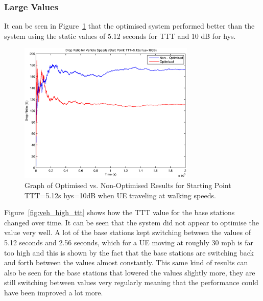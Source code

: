 \subsubsection*{Large Values}
It can be seen in Figure~\ref{fig:veh_high_drop} that the optimised system performed better than the system using the static values of 5.12 seconds for TTT and 10 dB for hys. 
\begin{figure}[H]
  \begin{center}
    	  \includegraphics[width=0.75\textwidth]{figures/vehicle_figures/high/long_drop.eps}
    \end{center}
    \caption{Graph of Optimised vs. Non-Optimised Results for Starting Point TTT=5.12s hys=10dB when UE traveling at walking speeds.}
    \label{fig:veh_high_drop}
\end{figure}
Figure~\ref{fig:veh_high_ttt} shows how the TTT value for the base stations changed over time. It can be seen that the system did not appear to optimise the value very well. A lot of the base stations kept switching between the values of 5.12 seconds and 2.56 seconds, which for a UE moving at roughly 30 mph is far too high and this is shown by the fact that the base stations are switching back and forth between the values almost constantly. This same kind of results can also be seen for the base stations that lowered the values slightly more, they are still switching between values very regularly meaning that the performance could have been improved a lot more. 

